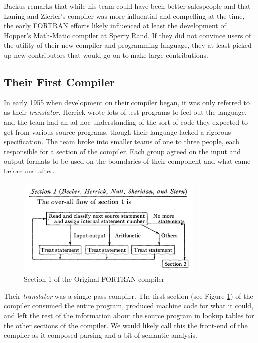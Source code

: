 Backus remarks that while his team could have been better salespeople and that
Laning and Zierler's compiler was more influential and compelling at the time, the early FORTRAN efforts
likely influenced at least the development of Hopper's Math-Matic compiler at
Sperry Rand.
If they did not convince users of the utility of their new compiler and programming language,
they at least picked up new contributors that would go on to make large contributions.

\subsection{Their First Compiler}

In early 1955 when development on their compiler began, it was only referred to as their \textit{translator}.
Herrick wrote lots of test programs to feel out the language, and the team had an ad-hoc understanding of the
sort of code they expected to get from various source programs, though their language lacked a
rigorous specification.
The team broke into smaller teams of one to three people, each responsible for a section of the compiler.
Each group agreed on the input and output formats to be used on the boundaries of their component and what came before and after.

\begin{figure}[h]
	\centering
	\includegraphics[width=0.8\textwidth]{resource/dawn/backus-fortran-sec-1.png}
	\caption{Section 1 of the Original FORTRAN compiler\cite{backus_etal_fortran_automatic_coding_system_1957}}
	\label{fig:backus_fortran_compiler}
\end{figure}

Their \textit{translator} was a single-pass compiler.
The first section (see Figure \ref{fig:backus_fortran_compiler}) of the compiler
consumed the entire program, produced machine code for what it could,
and left the rest of the information about the source program in lookup tables
for the other sections of the compiler.
We would likely call this the front-end of the compiler as it composed
parsing and a bit of semantic analysis.

